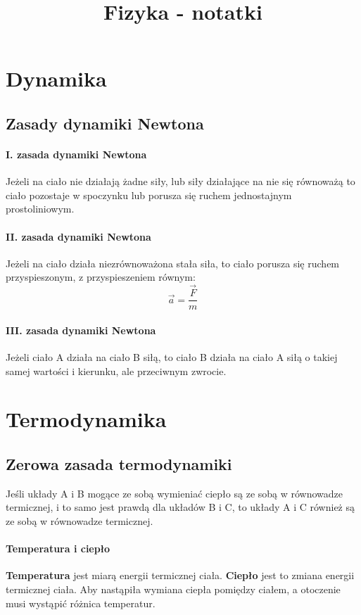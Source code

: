 \documentclass{article}
\title{Fizyka - notatki}
\begin{document}
    \maketitle
    \section{Dynamika}
        \subsection{Zasady dynamiki Newtona}
            \paragraph{I. zasada dynamiki Newtona}
                Jeżeli na ciało nie działają żadne siły, lub siły działające na nie się 
                równoważą to ciało pozostaje w spoczynku lub porusza się ruchem jednostajnym
                prostoliniowym.
            \paragraph{II. zasada dynamiki Newtona}
                Jeżeli na ciało działa niezrównoważona stała siła, to ciało porusza się 
                ruchem przyspieszonym, z przyspieszeniem równym:
                \begin{equation}
                    \vec{a} = \frac{\vec{F}}{m}
                \end{equation}
            \paragraph{III. zasada dynamiki Newtona}
                Jeżeli ciało A działa na ciało B siłą, to ciało B działa na ciało A siłą
                o takiej samej wartości i kierunku, ale przeciwnym zwrocie.
    \section{Termodynamika}
        \subsection{Zerowa zasada termodynamiki}
            Jeśli układy A i B mogące ze sobą wymieniać ciepło są ze sobą w równowadze 
            termicznej, i to samo jest prawdą dla układów B i C, to układy A i C również 
            są ze sobą w równowadze termicznej.

            \paragraph{Temperatura i ciepło}
                \textbf{Temperatura} jest miarą energii termicznej ciała.
                \textbf{Ciepło} jest to zmiana energii termicznej ciała.
                Aby nastąpiła wymiana ciepła pomiędzy ciałem, a otoczenie musi wystąpić
                różnica temperatur.
\end{document}
